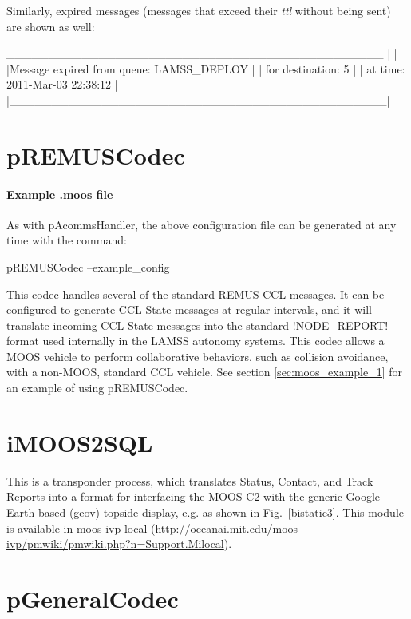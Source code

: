 Similarly, expired messages (messages that exceed their \textit{ttl} without being sent) are shown as well:
\begin{boxedverbatim}
 _____________________________________________
|                                             |
|Message expired from queue: LAMSS_DEPLOY     |
| for destination: 5                          |
| at time: 2011-Mar-03 22:38:12               |
|_____________________________________________|
\end{boxedverbatim}
\resetbvlinenumber
 
\section{pREMUSCodec}

\paragraph{Example .moos file}

\resetbvlinenumber
As with pAcommsHandler, the above configuration file can be generated at any time with the command:
\begin{boxedverbatim}
pREMUSCodec --example_config
\end{boxedverbatim}

This codec handles several of the standard REMUS CCL messages. It can be configured to generate CCL State messages at regular intervals, and it will translate incoming CCL State messages into the standard !NODE_REPORT! format used internally in the LAMSS autonomy systems. This codec allows a MOOS vehicle to perform collaborative behaviors, such as collision avoidance, with a non-MOOS, standard CCL vehicle. See section \ref{sec:moos_example_1} for an example of using pREMUSCodec.

\section{iMOOS2SQL}

This is a transponder process, which translates Status, Contact, and
Track Reports into a format for interfacing the MOOS C2 with the
generic Google Earth-based (geov) topside display, e.g. as shown in
Fig.~\ref{bistatic3}. This module is available in moos-ivp-local (\url{http://oceanai.mit.edu/moos-ivp/pmwiki/pmwiki.php?n=Support.Milocal}).


\section{pGeneralCodec}

